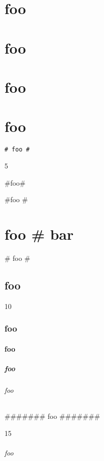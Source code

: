 
\def\mytitle{Headers}


\part{foo }
\label{foo}

\part{foo }
\label{foo}

\part{foo }
\label{foo}

\part{foo }
\label{foo}

\begin{verbatim}
# foo #
\end{verbatim}

5

\#foo\#

\#foo \#

\part{foo \# bar}
\label{foobar}

\# foo \#

\chapter{foo }
\label{foo}

10

\section{foo }
\label{foo}

\subsection{foo }
\label{foo}

\subsubsection{foo }
\label{foo}

\paragraph{foo }
\label{foo}

\#\#\#\#\#\#\# foo \#\#\#\#\#\#\#

15

\paragraph{foo }
\label{foo}



